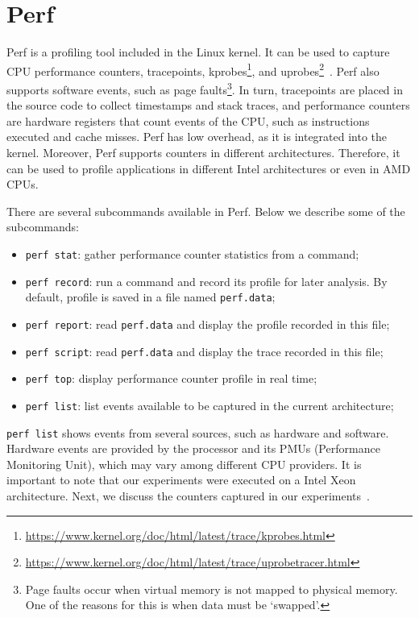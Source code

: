 \section{Perf}

Perf is a profiling tool included in the Linux kernel. It can be used to capture CPU performance counters, tracepoints, kprobes\footnote{\url{https://www.kernel.org/doc/html/latest/trace/kprobes.html}}, and uprobes\footnote{\url{https://www.kernel.org/doc/html/latest/trace/uprobetracer.html}}~\cite{perf_wiki}. Perf also supports software events, such as page faults\footnote{Page faults occur when virtual memory is not mapped to physical memory. One of the reasons for this is when data must be `swapped'.}. In turn, tracepoints are placed in the source code to collect timestamps and stack traces, and performance counters are hardware registers that count events of the CPU, such as instructions executed and cache misses. Perf has low overhead, as it is integrated into the kernel. Moreover, Perf supports counters in different architectures. Therefore, it can be used to profile applications in different Intel architectures or even in AMD CPUs.

There are several subcommands available in Perf. Below we describe some of the subcommands:

\begin{itemize}
	\item \texttt{perf stat}: gather performance counter statistics from a command;
    \item \texttt{perf record}: run a command and record its profile for later analysis. By default, profile is saved in a file named \texttt{perf.data};
    \item \texttt{perf report}: read \texttt{perf.data} and display the profile recorded in this file;
    \item \texttt{perf script}: read \texttt{perf.data} and display the trace recorded in this file;
	\item \texttt{perf top}: display performance counter profile in real time;
	\item \texttt{perf list}: list events available to be captured in the current architecture;
\end{itemize}

\texttt{perf list} shows events from several sources, such as hardware and software. Hardware events are provided by the processor and its PMUs (Performance Monitoring Unit), which may vary among different CPU providers. It is important to note that our experiments were executed on a Intel Xeon architecture. Next, we discuss the counters captured in our experiments~\cite{intel_pmu}.

